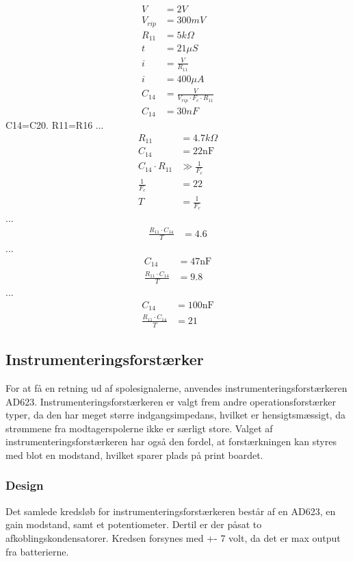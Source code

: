 \begin{align}
	V & = 2V \\
	V_{rip} & = 300mV \\
	R_{11} & = 5k \Omega \\
	t & = 21 \mu S \\
	i & = \frac{V}{R_{11}} \\
	i & = 400 \mu A \\
	C_{14} & = \frac{V}{V_{rip} \cdot F_c \cdot R_{11}}\\
		C_{14} & = 30nF
\end{align}
	C14=C20. R11=R16
...
\begin{align}
		R_{11} & = 4.7k \Omega \nonumber \\
		C_{14} & = 22 \si{\nano\farad} \nonumber \\
		C_{14} \cdot R_{11} & \gg \frac{1}{F_c} \\
		\frac{1}{F_c} & = 22 \\
		T & = \frac{1}{F_c}
\end{align}
...
	\begin{align}
		\frac{R_{11} \cdot C_{14}}{T} & = 4.6
	\end{align}
...
\begin{align}
	C_{14} & = 47 \si{\nano\farad} \nonumber \\
	\frac{R_{11} \cdot C_{14}}{T} & = 9.8
	\end{align}
...
\begin{align}
	C_{14} & = 100 \si{\nano\farad} \\
	\frac{R_{11} \cdot C_{14}}{T} & = 21
	\end{align}

\subsection{Instrumenteringsforstærker}
For at få en retning ud af spolesignalerne, anvendes instrumenteringsforstærkeren AD623. Instrumenteringsforstærkeren er valgt frem andre operationsforstærker typer, da den har meget større indgangsimpedans, hvilket er hensigtsmæssigt, da strømmene fra modtagerspolerne ikke er særligt store. Valget af instrumenteringsforstærkeren har også den fordel, at forstærkningen kan styres med blot en modstand, hvilket sparer plads på print boardet.



\subsubsection{Design}
Det samlede kredsløb for instrumenteringsforstærkeren består af en AD623, en gain modstand, samt et potentiometer. Dertil er der påsat to afkoblingskondensatorer. Kredsen forsynes med +- 7 volt, da det er max output fra batterierne.


